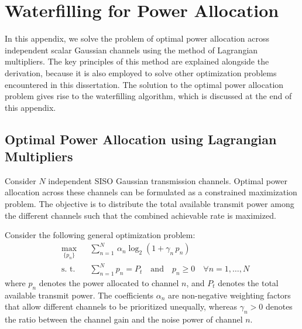 \chapter{Waterfilling for Power Allocation}
\label{appendix:waterfilling}

In this appendix, we solve the problem of optimal power allocation across independent scalar Gaussian channels using the method of Lagrangian multipliers.
The key principles of this method are explained alongside the derivation, because it is also employed to solve other optimization problems encountered in this dissertation.
The solution to the optimal power allocation problem gives rise to the waterfilling algorithm, which is discussed at the end of this appendix.


\section{Optimal Power Allocation using Lagrangian Multipliers}
\label{appendix_section:optimal_power_allocation_using_lagrangian_multipliers}

Consider $N$ independent \ac{SISO} Gaussian transmission channels.
Optimal power allocation across these channels can be formulated as a constrained maximization problem.
The objective is to distribute the total available transmit power among the different channels such that the combined achievable rate is maximized.

Consider the following general optimization problem:
\begin{equation}
\label{eq:optimal_power_allocation_optimization_problem}
\begin{aligned}
    & \underset{\{p_n\}}{\text{max}}
    & & \sum_{n=1}^{N} \, \alpha_n \log_2 \left( 1 + \gamma_n \, p_n \right) \\
    & \text{s. t.}
    & & \sum_{n=1}^{N} p_n = P_t \quad \text{and} \quad p_n \geq 0 \quad \forall n = 1, \dots, N
\end{aligned}
\end{equation}
where $p_n$ denotes the power allocated to channel $n$, and $P_t$ denotes the total available transmit power. 
The coefficients $\alpha_n$ are non-negative weighting factors that allow different channels to be prioritized unequally, whereas $\gamma_n > 0$ denotes the ratio between the channel gain and the noise power of channel $n$.

